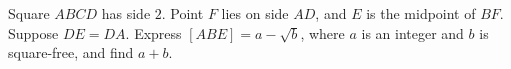 Square $ABCD$ has side $2$. Point $F$ lies on side $AD$, and $E$ is the midpoint of $BF$. Suppose $DE=DA$. Express $[ABE]=a-\sqrt b$, where $a$ is an integer and $b$ is square-free, and find $a+b$.
